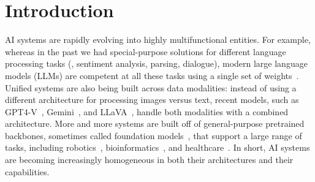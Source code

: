 \documentclass{article}
\newcommand{\bc}[1]{{\color{olive}BC: #1}}
\theoremstyle{plain}
\theoremstyle{definition}
\theoremstyle{remark}
\begin{document}


\section{Introduction}

AI systems are rapidly evolving into highly multifunctional entities. For example, whereas in the past we had special-purpose solutions for different language processing tasks (\eg, sentiment analysis, parsing, dialogue), modern large language models (LLMs) are competent at all these tasks using a single set of weights~\cite{srivastava2022beyond}. Unified systems are also being built across data modalities: instead of using a different architecture for processing images versus text, recent models, such as GPT4-V~\cite{achiam2023gpt}, Gemini~\cite{team2023gemini}, and LLaVA~\cite{liu2023llava}, handle both modalities with a combined architecture. 
More and more systems are built off of general-purpose pretrained backbones, sometimes called foundation models~\cite{bommasani2021opportunities}, that support a large range of tasks, including robotics~\cite{driess2023palm,brohan2023rt}, bioinformatics~\cite{ma2024segment}, and healthcare~\citep{steinberg2021language}.
In short, AI systems are becoming increasingly homogeneous in both their architectures and their capabilities.
\end{document}
